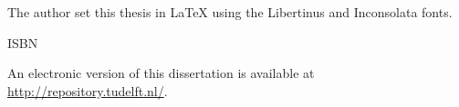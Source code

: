 \begin{titlepage}
\medskip
\medskip
\noindent The author set this thesis in \LaTeX\xspace using the Libertinus and Inconsolata fonts.

\vspace{\bigskipamount}



\noindent ISBN 

\medskip
\noindent An electronic version of this dissertation is available at \\
\url{http://repository.tudelft.nl/}.

\end{titlepage}

